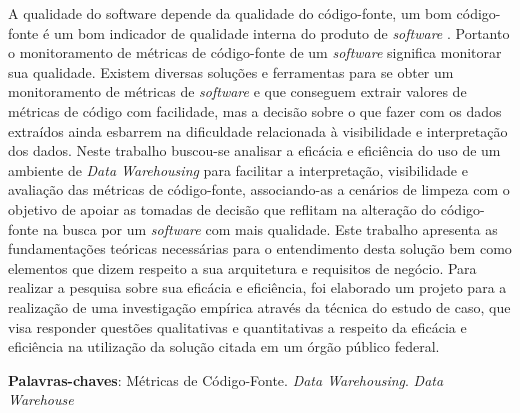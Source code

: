 \begin{resumo}

A qualidade do software depende da qualidade do código-fonte, um bom código-fonte é um bom indicador de qualidade interna do produto de \textit{software} \cite{ISO25023}. Portanto o monitoramento de métricas de código-fonte de um \textit{software} significa monitorar sua qualidade. Existem diversas soluções e ferramentas para se obter um monitoramento de métricas de \textit{software} e que conseguem extrair valores de métricas de código com facilidade, mas a decisão sobre o que fazer com os dados extraídos ainda esbarrem na dificuldade relacionada à visibilidade e interpretação dos dados. Neste trabalho buscou-se analisar a eficácia e eficiência do uso de um ambiente de \textit{Data Warehousing} para facilitar a interpretação, visibilidade e avaliação das métricas de código-fonte, associando-as a cenários de limpeza com o objetivo de apoiar as tomadas de decisão que reflitam na alteração do código-fonte na busca por um \textit{software }com mais qualidade. Este trabalho apresenta as fundamentações teóricas necessárias para o entendimento desta solução bem como elementos que dizem respeito a sua arquitetura e requisitos de negócio. Para realizar a pesquisa sobre sua eficácia e eficiência, foi elaborado um projeto para a realização de uma investigação empírica através da técnica do estudo de caso, que visa responder questões qualitativas e quantitativas a respeito da eficácia e eficiência na utilização da solução citada em um órgão público federal.

 \vspace{\onelineskip}
    
 \noindent
 \textbf{Palavras-chaves}: Métricas de Código-Fonte. \textit{Data Warehousing}. \textit{Data Warehouse}
\end{resumo}
